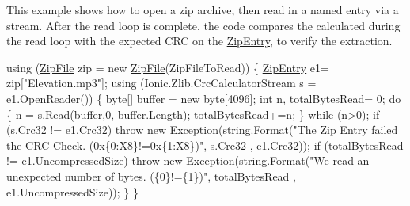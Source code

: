 This example shows how to open a zip archive, then read in a named entry via a stream. After the read loop is complete, the code compares the calculated during the read loop with the expected C\+RC on the {\ttfamily \mbox{\hyperlink{class_super_tiled2_unity_1_1_ionic_1_1_zip_1_1_zip_entry}{Zip\+Entry}}}, to verify the extraction. 
\begin{DoxyCode}
\textcolor{keyword}{using} (\mbox{\hyperlink{namespace_super_tiled2_unity_1_1_ionic_1_1_zip_a9ced5352c56e7e0fceff15b534073c83a088ad16b06174c69965e232063ba6d16}{ZipFile}} zip = \textcolor{keyword}{new} \mbox{\hyperlink{namespace_super_tiled2_unity_1_1_ionic_1_1_zip_a9ced5352c56e7e0fceff15b534073c83a088ad16b06174c69965e232063ba6d16}{ZipFile}}(ZipFileToRead))
\{
  \mbox{\hyperlink{class_super_tiled2_unity_1_1_ionic_1_1_zip_1_1_zip_entry_a440b6d4d136b20dc6bdbdd399397e3a0}{ZipEntry}} e1= zip[\textcolor{stringliteral}{"Elevation.mp3"}];
  \textcolor{keyword}{using} (Ionic.Zlib.CrcCalculatorStream s = e1.OpenReader())
  \{
    byte[] buffer = \textcolor{keyword}{new} byte[4096];
    \textcolor{keywordtype}{int} n, totalBytesRead= 0;
    \textcolor{keywordflow}{do} \{
      n = s.Read(buffer,0, buffer.Length);
      totalBytesRead+=n;
    \} \textcolor{keywordflow}{while} (n>0);
     \textcolor{keywordflow}{if} (s.Crc32 != e1.Crc32)
      \textcolor{keywordflow}{throw} \textcolor{keyword}{new} Exception(\textcolor{keywordtype}{string}.Format(\textcolor{stringliteral}{"The Zip Entry failed the CRC Check. (0x\{0:X8\}!=0x\{1:X8\})"}, s.Crc32
      , e1.Crc32));
     \textcolor{keywordflow}{if} (totalBytesRead != e1.UncompressedSize)
      \textcolor{keywordflow}{throw} \textcolor{keyword}{new} Exception(\textcolor{keywordtype}{string}.Format(\textcolor{stringliteral}{"We read an unexpected number of bytes. (\{0\}!=\{1\})"}, totalBytesRead
      , e1.UncompressedSize));
  \}
\}
\end{DoxyCode}
 
